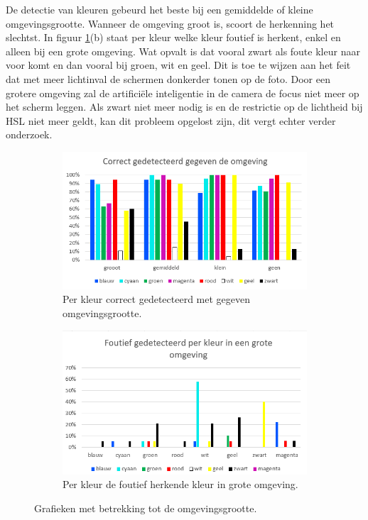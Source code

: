 De detectie van kleuren gebeurd het beste bij een gemiddelde of kleine omgevingsgrootte. Wanneer de omgeving groot is, scoort de herkenning het slechtst. In figuur \ref{fig:omgeving}(b) staat per kleur welke kleur foutief is herkent, enkel en alleen bij een grote omgeving. Wat opvalt is dat vooral zwart als foute kleur naar voor komt en dan vooral bij groen, wit en geel. Dit is toe te wijzen aan het feit dat met meer lichtinval de schermen donkerder tonen op de foto. Door een grotere omgeving zal de artificiële inteligentie in de camera de focus niet meer op het scherm leggen. Als zwart niet meer nodig is en de restrictie op de lichtheid bij HSL niet meer geldt, kan dit probleem opgelost zijn, dit vergt echter verder onderzoek.
\begin{figure}
	\begin{subfigure}{0.5\textwidth}
	\centering
	\includegraphics[scale=0.6]{img/Environment}
	\caption{Per kleur correct gedetecteerd met gegeven omgevingsgrootte.}
	\end{subfigure}
	\begin{subfigure}{0.5\textwidth}
	\centering
	\includegraphics[scale=0.6]{img/BigEnvPerColor}
	\caption{Per kleur de foutief herkende kleur in grote omgeving.}
	\end{subfigure}
	\caption{Grafieken met betrekking tot de omgevingsgrootte.}
	\label{fig:omgeving}
\end{figure}

